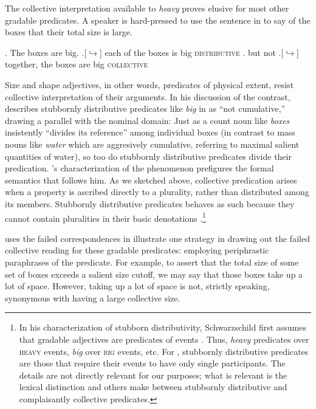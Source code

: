 \documentclass[linguex]{sp}
\begin{document}
The collective interpretation available to \emph{heavy} proves elusive for most other gradable predicates. A speaker is hard-pressed to use the sentence in \Next to say of the boxes that their total size is large.

\ex. The boxes are big.
\a.[$\hookrightarrow$] each of the boxes is big \hfill \textsc{distributive}
\z. but not
\a.[$\hookrightarrow$] together, the boxes are big \hfill \textsc{collective}

Size and shape adjectives, in other words, predicates of physical extent, resist collective interpretation of their arguments. In his discussion of the contrast, \citet{quine1960} describes stubbornly distributive predicates like \emph{big} in \Last as ``not cumulative,'' drawing a parallel with the nominal domain: Just as a count noun like \emph{boxes} insistently ``divides its reference'' among individual boxes (in contrast to mass nouns like \emph{water} which are aggresively cumulative, referring to maximal salient quantities of water), so too do stubbornly distributive predicates divide their predication. \citeauthor{quine1960}'s characterization of the phenomenon prefigures the formal semantics that follows him. As we sketched above, collective predication arises when a property is ascribed directly to a plurality, rather than distributed among its members. Stubbornly distributive predicates behaves as such because they cannot contain pluralities in their basic denotations \citep{schwarzschild2011,vazquezrojas2012,zhang2013}.\footnote{In his characterization of stubborn distributivity, Schwarzschild first assumes that gradable adjectives are predicates of events \citep[e.g.,][]{higginbothamschein1989}. Thus, \emph{heavy} predicates over \textsc{heavy} events, \emph{big} over \textsc{big} events, etc. For \citeauthor{schwarzschild2011}, stubbornly distributive predicates are those that require their events to have only single participants. The details are not directly relevant for our purposes; what is relevant is the lexical distinction \citeauthor{schwarzschild2011} and others make between stubbornly distributive and complaisantly collective predicates.}

\citet{schwarzschild2011} uses the failed correspondences in \Next illustrate one strategy in drawing out the failed collective reading for these gradable predicates: employing periphrastic paraphrases of the predicate. For example, to assert that the total size of some set of boxes exceeds a salient size cutoff, we may say that those boxes take up a lot of space. However, taking up a lot of space is not, strictly speaking, synonymous with having a large collective size.\\
\end{document}
